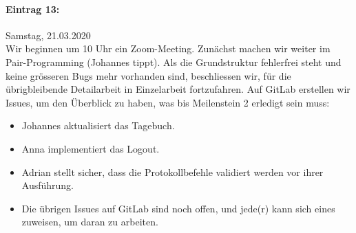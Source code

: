 \documentclass[12pt]{article}
\begin{document}
\paragraph{Eintrag 13:}
Samstag, 21.03.2020\\
Wir beginnen um 10 Uhr ein Zoom-Meeting. Zun\"achst machen wir weiter im Pair-Programming (Johannes tippt). Als die Grundstruktur fehlerfrei steht und keine gr\"osseren Bugs mehr vorhanden sind, beschliessen wir, für die \"ubrigbleibende Detailarbeit in Einzelarbeit fortzufahren. Auf GitLab erstellen wir Issues, um den \"Uberblick zu haben, was bis Meilenstein 2 erledigt sein muss: 
\begin{itemize} 
\item Johannes aktualisiert das Tagebuch.
\item Anna implementiert das Logout.
\item Adrian stellt sicher, dass die Protokollbefehle validiert werden vor ihrer Ausf\"uhrung.
\item Die \"ubrigen Issues auf GitLab sind noch offen, und jede(r) kann sich eines zuweisen, um daran zu arbeiten.
\end{itemize}
\end{document}
